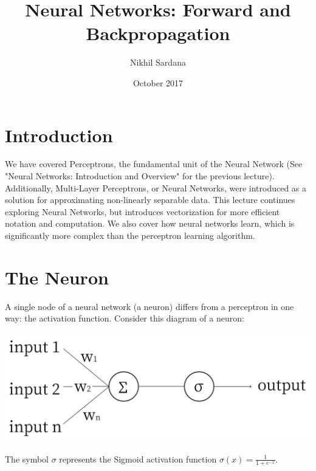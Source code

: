 \documentclass{article}
\title{Neural Networks: Forward and Backpropagation}
\author{ Nikhil Sardana }
\date{October 2017}
\begin{document}
\maketitle

\section{Introduction}

We have covered Perceptrons, the fundamental unit of the Neural Network (See "Neural Networks: Introduction and Overview" for the previous lecture). Additionally, Multi-Layer Perceptrons, or Neural Networks, were introduced as a solution for approximating non-linearly separable data. This lecture continues exploring Neural Networks, but introduces vectorization for more efficient notation and computation. We also cover how neural networks learn, which is significantly more complex than the perceptron learning algorithm.
\section{The Neuron}
A single node of a neural network (a neuron) differs from a perceptron in one way: the activation function. Consider this diagram of a neuron:
\begin{center}
\includegraphics[scale=0.3]{neuron}
\end{center}

The symbol $\sigma$ represents the Sigmoid activation function $\sigma(x) = \frac{1}{1 + e^{-x}}$.
\end{document}
